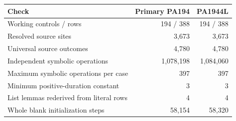\begin{center}
\begin{tabular}{@{}lrr@{}}
\toprule
Check & Primary PA194 & PA1944L\\\midrule
Working controls / rows & 194 / 388 & 194 / 388\\
Resolved source sites & 3,673 & 3,673\\
Universal source outcomes & 4,780 & 4,780\\
Independent symbolic operations & 1,078,198 & 1,084,060\\
Maximum symbolic operations per case & 397 & 397\\
Minimum positive-duration constant & 3 & 3\\
List lemmas rederived from literal rows & 4 & 4\\
Whole blank initialization steps & 58,154 & 58,320\\
\bottomrule
\end{tabular}
\end{center}
